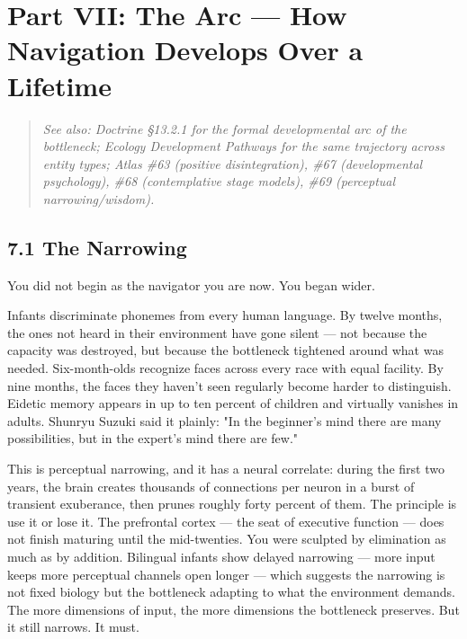\section*{Part VII: The Arc — How Navigation Develops Over a Lifetime}


\begin{quote}
\itshape
\textit{See also: Doctrine §13.2.1 for the formal developmental arc of the bottleneck; Ecology Development Pathways for the same trajectory across entity types; Atlas \#63 (positive disintegration), \#67 (developmental psychology), \#68 (contemplative stage models), \#69 (perceptual narrowing/\allowbreak wisdom).}
\end{quote}


\subsection*{7.1 The Narrowing}


You did not begin as the navigator you are now. You began wider.


Infants discriminate phonemes from every human language. By twelve months, the ones not heard in their environment have gone silent — not because the capacity was destroyed, but because the bottleneck tightened around what was needed. Six-month-olds recognize faces across every race with equal facility. By nine months, the faces they haven't seen regularly become harder to distinguish. Eidetic memory appears in up to ten percent of children and virtually vanishes in adults. Shunryu Suzuki said it plainly: "In the beginner's mind there are many possibilities, but in the expert's mind there are few."


This is perceptual narrowing, and it has a neural correlate: during the first two years, the brain creates thousands of connections per neuron in a burst of transient exuberance, then prunes roughly forty percent of them. The principle is use it or lose it. The prefrontal cortex — the seat of executive function — does not finish maturing until the mid-twenties. You were sculpted by elimination as much as by addition. Bilingual infants show delayed narrowing — more input keeps more perceptual channels open longer — which suggests the narrowing is not fixed biology but the bottleneck adapting to what the environment demands. The more dimensions of input, the more dimensions the bottleneck preserves. But it still narrows. It must.


